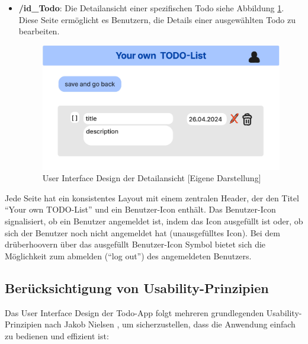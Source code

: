 \begin{itemize}
	\item \textbf{/{id\_Todo}}: Die Detailansicht einer spezifischen Todo siehe Abbildung \ref{UI_idTodo}. Diese Seite ermöglicht es Benutzern, die Details einer ausgewählten Todo zu bearbeiten.
	
	\begin{figure}[h]
		\centering
		\includegraphics[clip,width=0.75\linewidth]{images/idTodo.png}
		\caption[User Interface Design der Detailansicht]{User Interface Design der Detailansicht [Eigene Darstellung]}
		\label{UI_idTodo}
	\end{figure}	
	
\end{itemize}

Jede Seite hat ein konsistentes Layout mit einem zentralen Header, der den Titel "`Your own TODO-List"' und ein Benutzer-Icon enthält. Das Benutzer-Icon signalisiert, ob ein Benutzer angemeldet ist, indem das Icon ausgefüllt ist oder, ob sich der Benutzer noch nicht angemeldet hat (unausgefülltes Icon). Bei dem drüberhoovern über das ausgefüllt Benutzer-Icon Symbol bietet sich die Möglichkeit zum abmelden ("`log out"') des angemeldeten Benutzers. 

\subsection{Berücksichtigung von Usability-Prinzipien}

Das User Interface Design der Todo-App folgt mehreren grundlegenden Usability-Prinzipien nach Jakob Nielsen \cite{nielsen_10_nodate}, um sicherzustellen, dass die Anwendung einfach zu bedienen und effizient ist:

